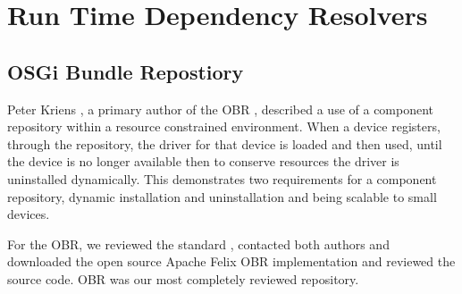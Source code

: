 \section{Run Time Dependency Resolvers}

\subsection{OSGi Bundle Repostiory}
Peter Kriens \cite{kriens_osgi_2008}, 
a primary author of the OBR \cite{the_osgi_alliance_rfc-0112_2006}, described a use of a component repository within a resource constrained environment.
When a device registers, 
through the repository, the driver for that device is loaded and then used, until the device is no longer available
then to conserve resources the driver is uninstalled dynamically. 
This demonstrates two requirements for a component repository, dynamic installation and uninstallation and being scalable to small devices.

For the OBR, we reviewed the standard \cite{the_osgi_alliance_rfc-0112_2006}, 
contacted both authors \cite{kriens_osgi_2008, richard_s._hall_obr_2008} 
and downloaded the open source Apache Felix OBR implementation and reviewed the source code.
OBR was our most completely reviewed repository.

